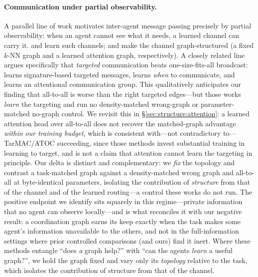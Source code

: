 \paragraph{Communication under partial observability.} A parallel line of
work motivates inter-agent message passing precisely by partial
observability: when an agent cannot see what it needs, a learned channel can
carry it.  \citep{sukhbaatar_2016_commnet} and
 \citep{foerster_2016_rial_dial} learn such channels;
 \citep{jiang_2020_dgn} and 
\citep{liu_2020_g2anet} make the channel graph-structured (a fixed $k$-NN
graph and a learned attention graph, respectively). A closely related line
argues specifically that \emph{targeted} communication beats one-size-fits-all
broadcast:  \citep{das_2019_tarmac} learns signature-based
targeted messages,  \citep{singh_2019_ic3net} learns
\emph{when} to communicate, and  \citep{jiang_2018_atoc} learns
an attentional communication group. This qualitatively anticipates our
finding that all-to-all is worse than the right targeted edges---but those
works \emph{learn} the targeting and run no density-matched wrong-graph or
parameter-matched no-graph control. We revisit this in
\S\ref{sec:structure:attention}: a learned attention head over all-to-all does
not recover the matched-graph advantage \emph{within our training budget},
which is consistent with---not contradictory to---TarMAC/ATOC succeeding, since
those methods invest substantial training in learning to target, and is not a
claim that attention cannot learn the targeting in principle. Our delta is distinct and complementary:
we \emph{fix} the topology and contrast a task-matched graph against a
density-matched wrong graph and all-to-all at byte-identical parameters,
isolating the contribution of \emph{structure} from that of the channel and of
the learned routing---a control these works do not run.
The positive endpoint we
identify sits squarely in this regime---private information that no agent can
observe locally---and is what reconciles it with our negative result: a
coordination graph earns its keep exactly when the task makes some agent's
information unavailable to the others, and not in the full-information
settings where prior controlled comparisons (and ours) find it inert. Where
these methods entangle ``does \emph{a} graph help?'' with ``can the agents
\emph{learn} a useful graph?'', we hold the graph fixed and vary only its
\emph{topology} relative to the task, which isolates the contribution of
structure from that of the channel.

